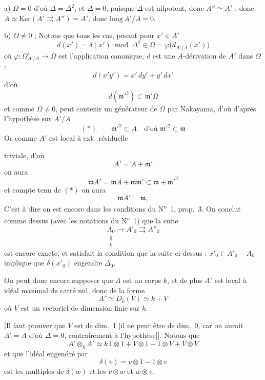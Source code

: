 \documentclass[11pt,a4paper]{article}
\begin{document}
a) $\Omega = 0$ d'où $\Delta = \Delta^2$,  et
$\Delta = 0$, puisque $\Delta$ est nilpotent, donc $A'' \simeq A'$ ; donc
$A \simeq \mathrm{Ker}(A' \rightrightarrows A'') = A'$, donc
$\mathrm{long}\, A'/A = 0$.

b) $\Omega \neq 0$ ; Notons que  tous les cas, posant
pour $x' \in A'$
\[
  d(x') = \delta(x') \bmod \Delta^2 \in \Omega
  = \varphi\bigl(d_{A'/A}(x')\bigr)
\]
 où $\varphi : \Omega^1_{A'/A} \to \Omega$ est
l'application canonique, $d$ est une $A$-dérivation de $A'$ dans
$\Omega$ :
\[
  d(x'y') = x'\,dy' + y'\,dx'
\]
d'où
\[
  d(\mathfrak{m}'^2) \subset \mathfrak{m}'\Omega
\]
et comme $\Omega \neq 0$, 
peut contenir un générateur de $\Omega$ par Nakayama,
d'où d'après  l'hypothèse sur $A'/A$
\[
  (*) \qquad \mathfrak{m}'^2 \subset A \quad \text{d'où }
  \mathfrak{m}'^2 \subset \mathfrak{m}
\]
Or comme $A'$ est local à ext.\ résiduelle


triviale,  d'où
\[
  A' = A + \mathfrak{m}'
\]
on aura
\[
  \mathfrak{m}A' = \mathfrak{m}A + \mathfrak{m}\mathfrak{m}'
  \subset \mathfrak{m} + \mathfrak{m}'^2
\]
et compte tenu de $(*)$ on aura
\[
  \mathfrak{m}A' = \mathfrak{m} ,
\]
C'est à dire on est encore dans les conditions du N\textsuperscript{o}~1,
prop.~3. On conclut comme dessus (avec les notations du
N\textsuperscript{o}~1) que la suite
\[
  \underset{\substack{\| \\ k}}{A_0} \to A'_0 \rightrightarrows A''_0
\]
est encore exacte, et satisfait  la condition que la
suite ci-dessus : $x'_0 \in A'_0 - A_0$ implique que $\delta(x'_0)$
engendre \struck{$\Delta$} $\Delta_0$.

On peut donc encore supposer que $A$ est un corps $k$, et de plus $A'$ est
local à idéal maximal de carré nul, donc de la forme
\[
  A' \simeq D_k(V) \simeq k + V
\]
où $V$ est un vectoriel de dimension finie sur $k$.


[Il faut prouver que $V$ est de dim.~1 [il ne peut être de dim.~0, car on
aurait $A' = A$ d'où $\Delta = 0$, contrairement à l'hypothèse]].
 Notons que
\[
  A' \otimes_k A' \simeq k\, 1 \otimes 1 + V \otimes 1 + 1 \otimes V
  + V \otimes V
\]
et que l'idéal engendré par
\[
  \delta(v) = v \otimes 1 - 1 \otimes v
\]
est \struck{\ill{}}  les multiples de
$\delta(w)$ et les $v \otimes w$ et $w \otimes v$.
\end{document}
